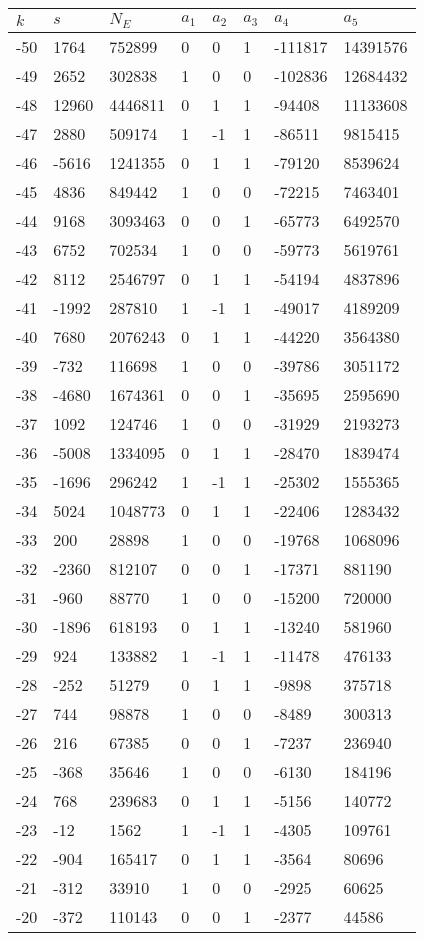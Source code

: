\documentclass{amsart}
\begin{document}
\begin{longtable}{|l|l|l|lllll|}
\hline
$k$ & $s$ & $N_E$ & $a_1$ & $a_2$ & $a_3$ & $a_4$ & $a_5$\\
\hline
-50&1764&752899&0&0&1&-111817&14391576\\
-49&2652&302838&1&0&0&-102836&12684432\\
-48&12960&4446811&0&1&1&-94408&11133608\\
-47&2880&509174&1&-1&1&-86511&9815415\\
-46&-5616&1241355&0&1&1&-79120&8539624\\
-45&4836&849442&1&0&0&-72215&7463401\\
-44&9168&3093463&0&0&1&-65773&6492570\\
-43&6752&702534&1&0&0&-59773&5619761\\
-42&8112&2546797&0&1&1&-54194&4837896\\
-41&-1992&287810&1&-1&1&-49017&4189209\\
-40&7680&2076243&0&1&1&-44220&3564380\\
-39&-732&116698&1&0&0&-39786&3051172\\
-38&-4680&1674361&0&0&1&-35695&2595690\\
-37&1092&124746&1&0&0&-31929&2193273\\
-36&-5008&1334095&0&1&1&-28470&1839474\\
-35&-1696&296242&1&-1&1&-25302&1555365\\
-34&5024&1048773&0&1&1&-22406&1283432\\
-33&200&28898&1&0&0&-19768&1068096\\
-32&-2360&812107&0&0&1&-17371&881190\\
-31&-960&88770&1&0&0&-15200&720000\\
-30&-1896&618193&0&1&1&-13240&581960\\
-29&924&133882&1&-1&1&-11478&476133\\
-28&-252&51279&0&1&1&-9898&375718\\
-27&744&98878&1&0&0&-8489&300313\\
-26&216&67385&0&0&1&-7237&236940\\
-25&-368&35646&1&0&0&-6130&184196\\
-24&768&239683&0&1&1&-5156&140772\\
-23&-12&1562&1&-1&1&-4305&109761\\
-22&-904&165417&0&1&1&-3564&80696\\
-21&-312&33910&1&0&0&-2925&60625\\
-20&-372&110143&0&0&1&-2377&44586\\

\end{longtable}
\end{document}
